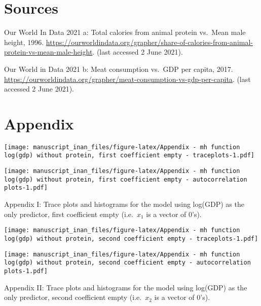 \documentclass[
]{article}
\begin{document}
\hypertarget{sources}{%
\section{Sources}\label{sources}}

Our World In Data 2021 a: Total calories from animal protein vs.~Mean
male height, 1996.
\url{https://ourworldindata.org/grapher/share-of-calories-from-animal-protein-vs-mean-male-height}.
(last accessed 2 June 2021).

Our World in Data 2021 b: Meat consumption vs.~GDP per capita, 2017.
\url{https://ourworldindata.org/grapher/meat-consumption-vs-gdp-per-capita}.
(last accessed 2 June 2021).

\hypertarget{appendix}{%
\section{Appendix}\label{appendix}}

\texttt{[image: manuscript\_inan\_files/figure-latex/Appendix - mh function log(gdp) without protein, first coefficient empty - traceplots-1.pdf]}

\texttt{[image: manuscript\_inan\_files/figure-latex/Appendix - mh function log(gdp) without protein, first coefficient empty - autocorrelation plots-1.pdf]}

Appendix I: Trace plots and histograms for the model using log(GDP) as
the only predictor, first coefficient empty (i.e.~\(x_1\) is a vector of
0's).

\texttt{[image: manuscript\_inan\_files/figure-latex/Appendix - mh function log(gdp) without protein, second coefficient empty - traceplots-1.pdf]}

\texttt{[image: manuscript\_inan\_files/figure-latex/Appendix - mh function log(gdp) without protein, second coefficient empty - autocorrelation plots-1.pdf]}

Appendix II: Trace plots and histograms for the model using log(GDP) as
the only predictor, second coefficient empty (i.e.~\(x_2\) is a vector
of 0's).
\end{document}
